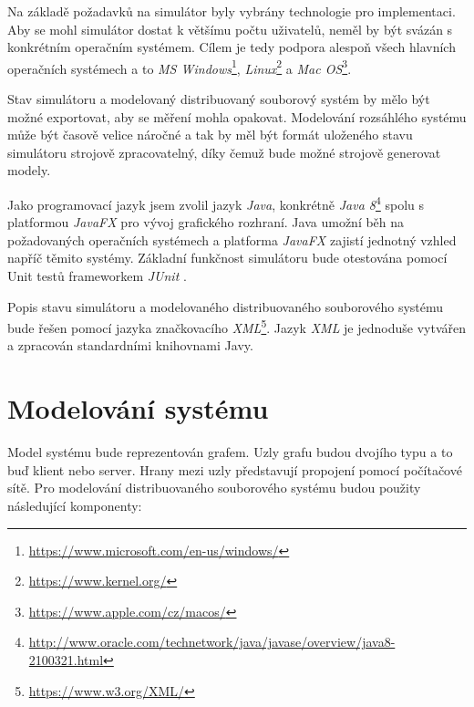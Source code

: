 \documentclass[czech,DP]{thesiskiv}
\begin{document}
Na základě požadavků na simulátor byly vybrány technologie pro implementaci. Aby se mohl simulátor dostat k většímu počtu uživatelů, neměl by být svázán s konkrétním operačním systémem. Cílem je tedy podpora alespoň všech hlavních operačních systémech a to \textit{MS Windows}\footnote{\url{https://www.microsoft.com/en-us/windows/}}, \textit{Linux}\footnote{\url{https://www.kernel.org/}} a \textit{Mac OS}\footnote{\url{https://www.apple.com/cz/macos/}}.

Stav simulátoru a modelovaný distribuovaný souborový systém by mělo být možné exportovat, aby se měření mohla opakovat. Modelování rozsáhlého systému může být časově velice náročné a tak by měl být formát uloženého stavu simulátoru strojově zpracovatelný, díky čemuž bude možné strojově generovat modely.

Jako programovací jazyk jsem zvolil jazyk \textit{Java}, konkrétně \textit{Java 8}\footnote{\url{http://www.oracle.com/technetwork/java/javase/overview/java8-2100321.html}} spolu s platformou \textit{JavaFX} \cite{javafxbook} pro vývoj grafického rozhraní. Java umožní běh na požadovaných operačních systémech a platforma \textit{JavaFX} zajistí jednotný vzhled napříč těmito systémy. Základní funkčnost simulátoru bude otestována pomocí Unit testů frameworkem \textit{JUnit} \cite{unittestpaper}.

Popis stavu simulátoru a modelovaného distribuovaného souborového systému bude řešen pomocí jazyka značkovacího \textit{XML}\footnote{\url{https://www.w3.org/XML/}}. Jazyk \textit{XML} je jednoduše vytvářen a zpracován standardními knihovnami Javy.

\section{Modelování systému}

Model systému bude reprezentován grafem. Uzly grafu budou dvojího typu a to buď klient nebo server. Hrany mezi uzly představují propojení pomocí počítačové sítě. Pro modelování distribuovaného souborového systému budou použity následující komponenty:
\end{document}
